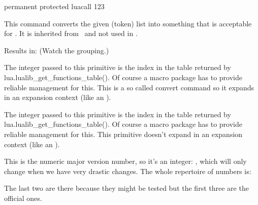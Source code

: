 \starttyping
permanent protected luacall 123
\stoptyping

\stopnewprimitive

\startnewprimitive[title={\prm {luaescapestring}}]

This command converts the given (token) list into something that is acceptable
for \LUA. It is inherited from \LUATEX\ and not used in \CONTEXT.

\startbuffer
{}
\stopbuffer

\typebuffer

Results in: \inlinebuffer\space (Watch the grouping.)

\stopnewprimitive

\startnewprimitive[title={\prm {luafunction}}]

The integer passed to this primitive is the index in the table returned by \typ
{lua.lualib_get_functions_table()}. Of course a macro package has to provide
reliable management for this. This is a so called convert command so it expands
in an expansion context (like an ).

\stopnewprimitive

\startnewprimitive[title={\prm {luafunctioncall}}]

The integer passed to this primitive is the index in the table returned by \typ
{lua.lualib_get_functions_table()}. Of course a macro package has to provide
reliable management for this. This primitive doesn't expand in an expansion
context (like an ).

\stopnewprimitive

\startnewprimitive[title={\prm {luametatexmajorversion}}]

This is the numeric major version number, so it's an integer: \the
\luametatexmajorversion, which will only change when we have very drastic
changes. The whole repertoire of numbers is:

\starttabulate
\NC \type {\the\luametatexmajorversion} \NC \the\luametatexmajorversion \NC \NR
\NC \type {\the\luametatexminorversion} \NC \the\luametatexminorversion \NC \NR
\NC \type {\the\luametatexrelease}      \NC \the\luametatexrelease      \NC \NR
\NC \type {\the\luametatexversion}      \NC \the\luametatexversion      \NC \NR
\stoptabulate

The last two are there because they might be tested but the first three are the
official ones.

\stopnewprimitive

